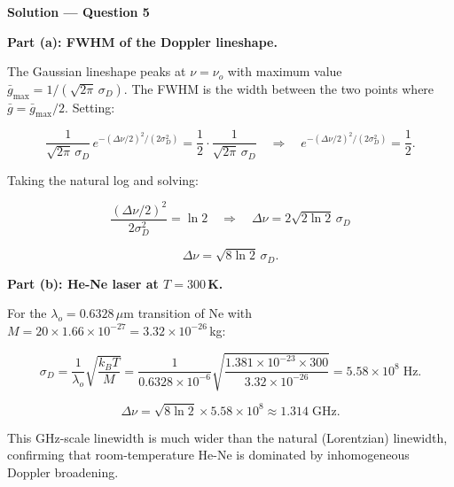 \textbf{\large Solution --- Question 5}

\textbf{Part (a): FWHM of the Doppler lineshape.}

The Gaussian lineshape peaks at $\nu = \nu_o$ with maximum value $\bar{g}_{\mathrm{max}} = 1/(\sqrt{2\pi}\,\sigma_D)$. The FWHM is the width between the two points where $\bar{g} = \bar{g}_{\mathrm{max}}/2$. Setting:

\begin{equation*}
  \frac{1}{\sqrt{2\pi}\,\sigma_D}\,e^{-(\Delta\nu/2)^{2}/(2\sigma_D^{2})} = \frac{1}{2}\cdot\frac{1}{\sqrt{2\pi}\,\sigma_D}
  \quad\Longrightarrow\quad
  e^{-(\Delta\nu/2)^{2}/(2\sigma_D^{2})} = \frac{1}{2}.
\end{equation*}

Taking the natural log and solving:

\begin{equation*}
  \frac{(\Delta\nu/2)^{2}}{2\sigma_D^{2}} = \ln 2
  \quad\Longrightarrow\quad
  \Delta\nu = 2\sqrt{2\ln 2}\,\sigma_D
\end{equation*}

\begin{equation*}
  \boxed{\Delta\nu = \sqrt{8\ln 2}\,\sigma_D.}
\end{equation*}

\textbf{Part (b): He-Ne laser at $T = 300$\,K.}

For the $\lambda_o = 0.6328\,\mu$m transition of Ne with $M = 20\times1.66\times10^{-27} = 3.32\times10^{-26}$\,kg:

\begin{equation*}
  \sigma_D = \frac{1}{\lambda_o}\sqrt{\frac{k_BT}{M}}
  = \frac{1}{0.6328\times10^{-6}}\sqrt{\frac{1.381\times10^{-23}\times300}{3.32\times10^{-26}}}
  = 5.58\times10^{8}\;\text{Hz}.
\end{equation*}

\begin{equation*}
  \boxed{\Delta\nu = \sqrt{8\ln 2}\times5.58\times10^{8} \approx 1.314\;\text{GHz}.}
\end{equation*}

This GHz-scale linewidth is much wider than the natural (Lorentzian) linewidth, confirming that room-temperature He-Ne is dominated by inhomogeneous Doppler broadening.



